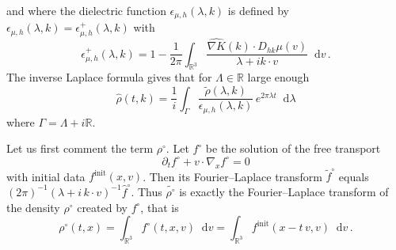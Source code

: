 \documentclass[a4paper,12pt]{amsart} %
\theoremstyle{plain}
\theoremstyle{definition}
\newcommand		{\RR}		{\mathbb R}			%
\newcommand		{\R}		{\RR}
\newcommand		{\Rd}		{\R^3}
\renewcommand	{\(}			{\lt(}
\renewcommand	{\)}			{\rt)}
\renewcommand		{\d}		{\mathop{}\!\mathrm{d}}		%
\newcommand		{\intd}			{\int_{\Rd}}
\newcommand		{\init}			{\mathrm{init}}
\newcommand	{\h}			{h}
\newcommand		{\opgam}		{{\boldsymbol{\gamma}}}
\newcommand		{\op}			{\opgam}	%
\begin{document}
	and where the dielectric function $\epsilon_{\mu,\h}(\lambda,k)$ is defined by 
	$\epsilon_{\mu,\h}(\lambda,k) = \epsilon_{\mu,\h}^+(\lambda,k)$ with
	\begin{equation*}
		\epsilon_{\mu,\h}^+(\lambda,k) = 1 - \frac{1}{2\pi}\intd \frac{\widehat{\nabla K}(k)\cdot D_{h k}\mu(v)}{\lambda + i k\cdot v} \d v \, .
	\end{equation*}
	The inverse Laplace formula gives that for $\Lambda\in\R$ large enough
	\begin{equation*}
		\widehat{\rho}(t,k) = \frac{1}{i} \int_\Gamma \frac{\widetilde{\rho}(\lambda,k)}{\epsilon_{\mu,\h}(\lambda,k)} \,e^{2\pi\lambda t}\d\lambda
	\end{equation*}
	where $\Gamma = \Lambda + i\R$. 

	Let us first comment the term $\rho^\circ$. Let $f^\circ$ be the solution of the free transport 
	\begin{equation*}
		\partial_t f^\circ + v \cdot \nabla_x f^\circ = 0
	\end{equation*}
	with initial data $f^\init(x,v)$. Then its Fourier--Laplace transform $\tilde f^\circ$ equals $(2\pi)^{-1}(\lambda + i\, k \cdot v)^{-1} \hat f^\circ$. Thus $\widetilde{\rho^\circ}$ is exactly the Fourier--Laplace transform of the density $\rho^\circ$ created by $f^\circ$, that is
	\begin{equation*}
		\rho^\circ(t,x) = \intd f^\circ(t,x,v) \d v = \intd f^\init(x-t\,v,v)\d v\, .
	\end{equation*}
	
\end{document}
